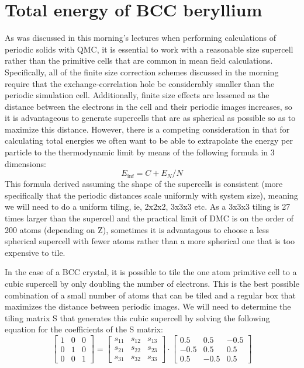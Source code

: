 \section{Total energy of BCC beryllium}

As was discussed in this morning’s lectures when performing calculations of periodic solids with QMC, it is essential to work with a reasonable size supercell rather than the primitive cells that are common in mean field calculations.  Specifically, all of the finite size correction schemes discussed in the morning require that the exchange-correlation hole be considerably smaller than the periodic simulation cell.  Additionally, finite size effects are lessened as the distance between the electrons in the cell and their periodic images increases, so it is advantageous to generate supercells that are as spherical as possible so as to maximize this distance.  However, there is a competing consideration in that for calculating total energies we often want to be able to extrapolate the energy per particle to the thermodynamic limit by means of the following formula in 3 dimensions:
\begin{equation}
E_{\inf} = C + E_{N}/N
\end{equation}
This formula derived assuming the shape of the supercells is consistent (more specifically that the periodic distances scale uniformly with system size), meaning we will need to do a uniform tiling, ie, 2x2x2, 3x3x3 etc.  As a 3x3x3 tiling is 27 times larger than the supercell and the practical limit of DMC is on the order of 200 atoms (depending on Z), sometimes it is advantagous to choose a less spherical supercell with fewer atoms rather than a more spherical one that is too expensive to tile.

In the case of a BCC crystal, it is possible to tile the one atom primitive cell to a cubic supercell by only doubling the number of electrons.  This is the best possible combination of a small number of atoms that can be tiled and a regular box that maximizes the distance between periodic images.  We will need to determine the tiling matrix S that generates this cubic supercell by solving the following equation for the coefficients of the S matrix:
\begin{equation}
 \left[\begin{array}{rrr}
  1 & 0 & 0 \\
  0 & 1 & 0 \\
  0 & 0 & 1 
  \end{array}\right] =  \left[\begin{array}{rrr}
  s_{11} & s_{12} & s_{13} \\
  s_{21} & s_{22} & s_{23} \\
  s_{31} & s_{32} & s_{33} 
  \end{array}\right] \cdot 
\left[\begin{array}{rrr}
  0.5 &  0.5 & -0.5 \\
 -0.5 &  0.5 &  0.5 \\
  0.5 & -0.5 &  0.5
\end{array}\right] 
\end{equation}

